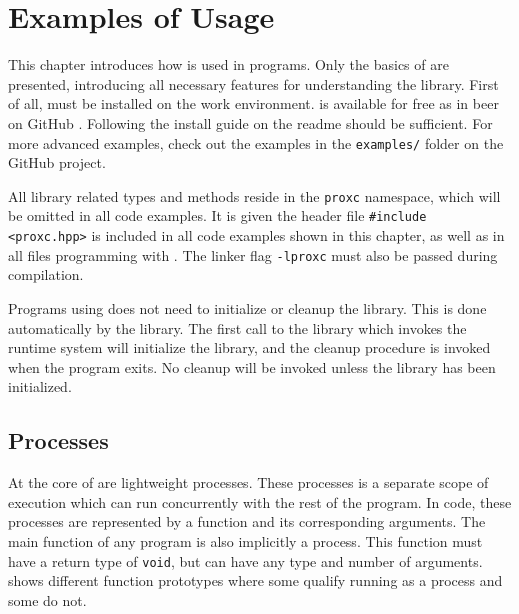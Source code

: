 

\chapter{Examples of Usage}
\label{ch:examples_usage}

This chapter introduces how \Proxc{} is used in \Cpp{} programs. Only the basics of \Proxc{} are presented, introducing all necessary features for understanding the library. First of all, \Proxc{} must be installed on the work environment. \Proxc{} is available for free as in beer on GitHub \citep{pettersen2017proxcgithub}. Following the install guide on the readme should be sufficient. For more advanced examples, check out the examples in the \texttt{examples/} folder on the GitHub project.

All library related types and methods reside in the \lstinline[style={CustomC++}]|proxc| namespace, which will be omitted in all code examples. It is given the header file \lstinline[style={CustomC++}]|#include <proxc.hpp>| is included in all code examples shown in this chapter, as well as in all \Cpp{} files programming with \Proxc. The linker flag \lstinline[style={CustomC++}]|-lproxc| must also be passed during compilation.

Programs using \Proxc{} does not need to initialize or cleanup the library. This is done automatically by the library. The first call to the library which invokes the runtime system will initialize the library, and the cleanup procedure is invoked when the program exits. No cleanup will be invoked unless the library has been initialized. 


\section{Processes}


At the core of \Proxc{} are lightweight processes. These processes is a separate scope of execution which can run concurrently with the rest of the program. In code, these processes are represented by a function and its corresponding arguments. The main function of any \Cpp{} program is also implicitly a process. This function must have a return type of \lstinline[style={CustomC++}]|void|, but can have any type and number of arguments.  shows different function prototypes where some qualify running as a process and some do not.

